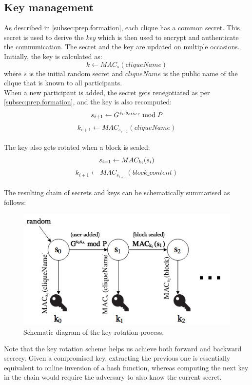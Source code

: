 \documentclass[a4paper, 12pt]{report}
\begin{document}
\subsection{Key management}
\label{subsec:prep.keyman}
As described in \cref{subsec:prep.formation}, each clique has a common secret. This secret is used to derive the \emph{key} which is then used to encrypt and authenticate the communication. The secret and the key are updated on multiple occasions. Initially, the key is calculated as:
\begin{equation*}
    k \leftarrow MAC_{s}(cliqueName)
\end{equation*}
where $s$ is the initial random secret and $cliqueName$ is the public name of the clique that is known to all participants. \\ 

When a new participant is added, the secret gets renegotiated as per \cref{subsec:prep.formation}, and the key is also recomputed: \\
\[
    s_{i+1} \leftarrow G^{s_i \cdot s_{other}} \bmod P  \\ 
\]
\[
    k_{i+1} \leftarrow MAC_{s_{i+1}}(cliqueName)
\] \\


The key also gets rotated when a block is sealed:
\[
    s_{i+1} \leftarrow MAC_{k_i}(s_i) \\ 
\]
\[
    k_{i+1} \leftarrow MAC_{s_{i+1}}(block\_content)
\] \\

The resulting chain of secrets and keys can be schematically summarised as follows:
\begin{figure}[H]
    \centering
    \includegraphics[width = 0.8 \linewidth]{pics/keys_secrets.png}
    \caption{\label{fig:keys_secrets}Schematic diagram of the key rotation process.}
\end{figure}

Note that the key rotation scheme helps us achieve both forward and backward secrecy. Given a compromised key, extracting the previous one is essentially equivalent to online inversion of a hash function, whereas computing the next key in the chain would require the adversary to also know the current secret.
\end{document}
